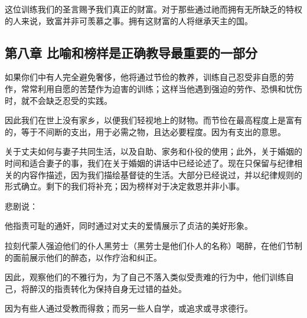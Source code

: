 这位训练我们的圣言赐予我们真正的财富。对于那些通过祂而拥有无所缺乏的特权的人来说，致富并非可羡慕之事。拥有这财富的人将继承天主的国。\par


\subsection{第八章 比喻和榜样是正确教导最重要的一部分}

如果你们中有人完全避免奢侈，他将通过节俭的教养，训练自己忍受非自愿的劳作，常常利用自愿的苦楚作为迫害的训练；这样当他遇到强迫的劳作、恐惧和忧伤时，就不会缺乏忍受的实践。\par

因此我们在世上没有家乡，以便我们轻视地上的财物。而节俭在最高程度上是富有的，等于不间断的支出，用于必需之物，且达必要程度。因为有支出的意思。\par

关于丈夫如何与妻子共同生活，以及自助、家务和仆役的使用；此外，关于婚姻的时间和适合妻子的事，我们在关于婚姻的讲话中已经论述了。现在只保留与纪律相关的内容作描述，因为我们描绘基督徒的生活。大部分已经说过，并以纪律规则的形式确立。剩下的我们将补充；因为榜样对于决定救恩并非小事。\par

悲剧说：\par

\par

他指责可耻的通奸，同时通过对丈夫的爱情展示了贞洁的美好形象。\par

拉刻代蒙人强迫他们的仆人黑劳士（黑劳士是他们仆人的名称）喝醉，在他们节制的面前展示他们的醉态，以作疗治和纠正。\par

因此，观察他们的不雅行为，为了自己不落入类似受责难的行为中，他们训练自己，将醉汉的指责转化为保持自身无过错的益处。\par

因为有些人通过受教而得救；而另一些人自学，或追求或寻求德行。\par

\par

